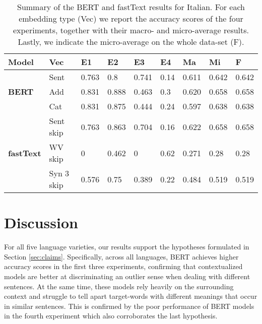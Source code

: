 \begin{table*}[h]
    \centering
    \begin{tabularx}{\textwidth}{Xl|lllllll}
        \hline
        \textbf{Model}  &   \textbf{Vec}   &   \textbf{E1} &   \textbf{E2} &   \textbf{E3} &   \textbf{E4} &   \textbf{Ma} &   \textbf{Mi} &   \textbf{F}  \\
        \hline
        \multirow{3}{*}{\textbf{BERT}}   & Sent  &   0.763   &   0.8   &   0.741   &   0.14    &   0.611   &   0.642   &   0.642   \\
                                & Add  &   0.831   &   0.888   &   0.463   &   0.3    &   0.620   &   0.658   &   0.658   \\
                                & Cat  &   0.831   &   0.875   &   0.444   &   0.24    &   0.597   &   0.638   &   0.638   \\
        \hline
        \multirow{3}{*}{\textbf{fastText}}   &   Sent skip   & 0.763  &   0.863   &   0.704   &   0.16   &   0.622   &   0.658   &   0.658    \\
                                    &   WV skip   & 0  &   0.462   &   0   &   0.62   &   0.271   &   0.28   &   0.28    \\
                                    &   Syn 3 skip   & 0.576  &   0.75   &   0.389   &   0.22   &   0.484   &   0.519   &   0.519
    \end{tabularx}
    \caption{Summary of the BERT and fastText results for Italian. For each embedding type (Vec) we report the accuracy scores of the four experiments, together with their macro- and micro-average results. Lastly, we indicate the micro-average on the whole data-set (F).}\label{table:results-ita}
\end{table*}

\section{Discussion}
For all five language varieties, our results support the hypotheses formulated in Section \ref{sec:claims}. Specifically, across all languages, BERT achieves higher accuracy scores in the first three experiments, confirming that contextualized models are better at discriminating an outlier sense when dealing with different sentences. At the same time, these models rely heavily on the surrounding context and struggle to tell apart target-words with different meanings that occur in similar sentences. This is confirmed by the poor performance of BERT models in the fourth experiment which also corroborates the last hypothesis.

